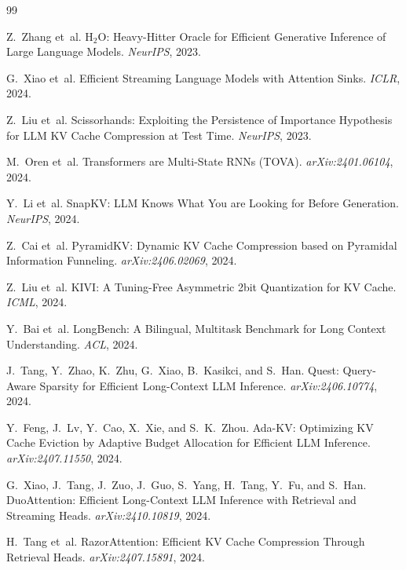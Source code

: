 \documentclass[11pt,a4paper]{article}
\begin{document}
\begin{thebibliography}{99}

Z.~Zhang et~al.
\newblock H$_2$O: Heavy-Hitter Oracle for Efficient Generative Inference of Large Language Models.
\newblock \emph{NeurIPS}, 2023.

G.~Xiao et~al.
\newblock Efficient Streaming Language Models with Attention Sinks.
\newblock \emph{ICLR}, 2024.

Z.~Liu et~al.
\newblock Scissorhands: Exploiting the Persistence of Importance Hypothesis for LLM KV Cache Compression at Test Time.
\newblock \emph{NeurIPS}, 2023.

M.~Oren et~al.
\newblock Transformers are Multi-State RNNs (TOVA).
\newblock \emph{arXiv:2401.06104}, 2024.

Y.~Li et~al.
\newblock SnapKV: LLM Knows What You are Looking for Before Generation.
\newblock \emph{NeurIPS}, 2024.

Z.~Cai et~al.
\newblock PyramidKV: Dynamic KV Cache Compression based on Pyramidal Information Funneling.
\newblock \emph{arXiv:2406.02069}, 2024.

Z.~Liu et~al.
\newblock KIVI: A Tuning-Free Asymmetric 2bit Quantization for KV Cache.
\newblock \emph{ICML}, 2024.

Y.~Bai et~al.
\newblock LongBench: A Bilingual, Multitask Benchmark for Long Context Understanding.
\newblock \emph{ACL}, 2024.

J.~Tang, Y.~Zhao, K.~Zhu, G.~Xiao, B.~Kasikci, and S.~Han.
\newblock Quest: Query-Aware Sparsity for Efficient Long-Context LLM Inference.
\newblock \emph{arXiv:2406.10774}, 2024.

Y.~Feng, J.~Lv, Y.~Cao, X.~Xie, and S.~K.~Zhou.
\newblock Ada-KV: Optimizing KV Cache Eviction by Adaptive Budget Allocation for Efficient LLM Inference.
\newblock \emph{arXiv:2407.11550}, 2024.

G.~Xiao, J.~Tang, J.~Zuo, J.~Guo, S.~Yang, H.~Tang, Y.~Fu, and S.~Han.
\newblock DuoAttention: Efficient Long-Context LLM Inference with Retrieval and Streaming Heads.
\newblock \emph{arXiv:2410.10819}, 2024.

H.~Tang et~al.
\newblock RazorAttention: Efficient KV Cache Compression Through Retrieval Heads.
\newblock \emph{arXiv:2407.15891}, 2024.


\end{thebibliography}
\end{document}
